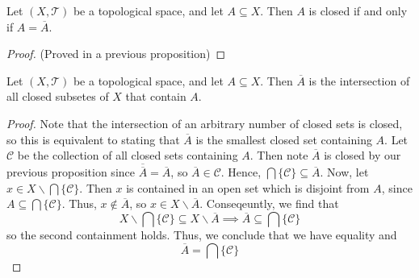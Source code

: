 \documentclass[12pt, a4paper, oneside, openright, titlepage]{book}
\begin{document}
\begin{prop}
    Let $(X,\mathcal{T})$ be a topological space, and let $A \subseteq X$. Then $A$ is closed if and only if $A = \overline{A}$.
\end{prop}
\begin{proof}
    (Proved in a previous proposition)
\end{proof}

\begin{prop}
    Let $(X,\mathcal{T})$ be a topological space, and let $A\subseteq X$. Then $\overline{A}$ is the intersection of all closed subsetes of $X$ that contain $A$.
\end{prop}
\begin{proof}
    Note that the intersection of an arbitrary number of closed sets is closed, so this is equivalent to stating that $\overline{A}$ is the smallest closed set containing $A$. Let $\mathcal{C}$ be the collection of all closed sets containing $A$. Then note $\overline{A}$ is closed by our previous proposition since $\overline{\overline{A}} = \overline{A}$, so $\overline{A} \in \mathcal{C}$. Hence, $\bigcap\{\mathcal{C}\}\subseteq \overline{A}$. Now, let $x \in X\backslash\bigcap\{\mathcal{C}\}$. Then $x$ is contained in an open set which is disjoint from $A$, since $A \subseteq \bigcap\{\mathcal{C}\}$. Thus, $x \notin \overline{A}$, so $x \in X\backslash \overline{A}$. Conseqeuntly, we find that \begin{equation*}
        X\backslash\bigcap\{\mathcal{C}\} \subseteq X\backslash \overline{A} \implies \overline{A} \subseteq \bigcap\{\mathcal{C}\}
    \end{equation*}
    so the second containment holds. Thus, we conclude that we have equality and \begin{equation*}
        \overline{A} = \bigcap\{\mathcal{C}\}
    \end{equation*}
\end{proof}
\end{document}
